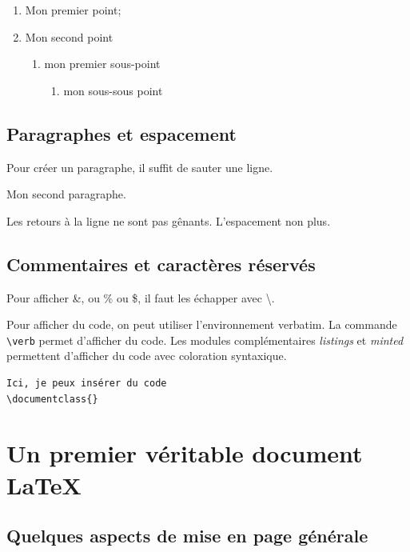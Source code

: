 \documentclass[12pt,a4paper]{book} %
\begin{document}
\begin{enumerate}
\item Mon premier point;
\item Mon second point
	\begin{enumerate}
	\item mon premier sous-point
		\begin{enumerate}
		\item mon sous-sous point
		\end{enumerate}
	\end{enumerate}
\end{enumerate}

\subsection{Paragraphes et espacement}

Pour créer un paragraphe, il suffit de sauter une ligne.


Mon second paragraphe.

Les
retours
à
la
ligne %
ne sont pas gênants.
L'espacement     non			 plus.

\subsection{Commentaires et caractères réservés}
Pour afficher \&, ou \% ou \$, il faut les échapper avec \textbackslash{}.

Pour afficher du code, on peut utiliser l'environnement verbatim. La commande \verb=\verb= permet d'afficher du code. Les modules complémentaires \emph{listings} et \emph{minted} permettent d'afficher du code avec coloration syntaxique.

\begin{verbatim}
Ici, je peux insérer du code
\documentclass{}
\end{verbatim}

\section{Un premier véritable document \LaTeX{}}

\subsection{Quelques aspects de mise en page générale}
\end{document}
